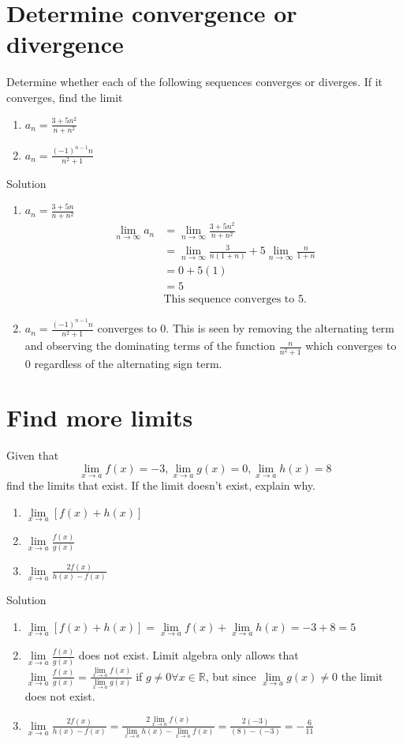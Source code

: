 \documentclass[12pt]{article}
\begin{document}
\section{Determine convergence or divergence}
Determine whether each of the following sequences converges or diverges. If it converges, find the limit
\begin{enumerate}
    \item $a_n = \frac{3+5n^2}{n+n^2}$
    \item $a_n = \frac{(-1)^{n-1}n}{n^2+1}$
\end{enumerate}
Solution
\begin{enumerate}
    \item $a_n = \frac{3+5n}{n+n^2}$
    \begin{align*}
        \lim\limits_{n \to \infty} a_n &= \lim\limits_{n \to \infty} \frac{3+5n^2}{n+n^2} \\ &= \lim\limits_{n \to \infty} \frac{3}{n(1+n)} + 5\lim\limits_{n \to \infty} \frac{n}{1+n}
        \\ &= 0 + 5(1)
        \\ &= 5
        \\ & \text{This sequence converges to 5.}
    \end{align*}
    \item $a_n = \frac{(-1)^{n-1}n}{n^2+1}$ converges to 0. This is seen by removing the alternating term and observing the dominating terms of the  function $ \frac{n}{n^2+1}$ which converges to 0 regardless of the alternating sign term.
\end{enumerate}

\section{Find more limits}
Given that 
\[ \lim\limits_{x \to a} f(x) =-3, \lim\limits_{x \to a} g(x) =0, \lim\limits_{x\to a} h(x) = 8\]
find the limits that exist. If the limit doesn’t exist, explain why.
\begin{enumerate}
    \item $\lim\limits_{x \to a} [f(x) + h(x)]$
    \item $\lim\limits_{x \to a} \frac{f(x)}{g(x)}$
    \item $\lim\limits_{x \to a} \frac{2f(x)}{h(x) - f(x)}$
\end{enumerate}
Solution

\begin{enumerate}
    \item $\lim\limits_{x \to a} [f(x) + h(x)] = \lim\limits_{x \to a} f(x) + \lim\limits_{x \to a} h(x) = -3 + 8=5$
    \item $\lim\limits_{x \to a} \frac{f(x)}{g(x)}$ does not exist. Limit algebra only allows that $\lim\limits_{x \to a} \frac{f(x)}{g(x)} = \frac{\lim\limits_{x \to a} f(x)}{\lim\limits_{x \to a} g(x)}$ if $g \neq 0 \forall x \in \mathbb{R}$, but since $\lim\limits_{x \to a} g(x) \neq 0$ the limit does not exist.
    \item $\lim\limits_{x \to a} \frac{2f(x)}{h(x) - f(x)} =\frac{2 \lim\limits_{x \to a}  f(x)}{ \lim\limits_{x \to a} h(x) - \lim\limits_{x \to a}  f(x)} = \frac{2(-3)}{(8)- (-3)} = -\frac{6}{11}$
\end{enumerate}
\end{document}
